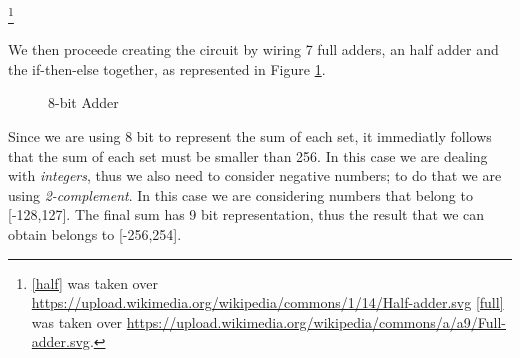 \documentclass[12pt]{article}
\begin{document}
\footnote{\ref{half} was taken over \url{https://upload.wikimedia.org/wikipedia/commons/1/14/Half-adder.svg} 
\ref{full} was taken over \url{https://upload.wikimedia.org/wikipedia/commons/a/a9/Full-adder.svg}.}

We then proceede creating the circuit by wiring 7 full adders, an half adder and the if-then-else together, as represented in Figure \ref{circuit}.

\begin{figure}[!h]
    \caption{8-bit Adder}\label{circuit}
\end{figure}
Since we are using 8 bit to represent the sum of each set, it immediatly follows that the sum of each set must be smaller than 256. In this case we are dealing with \textit{integers}, thus we also need to consider negative numbers; to do that we are using \textit{2-complement}. In this case we are considering numbers that belong to [-128,127]. The final sum has 9 bit representation, thus the result that we can obtain belongs to [-256,254]. 
\end{document}
